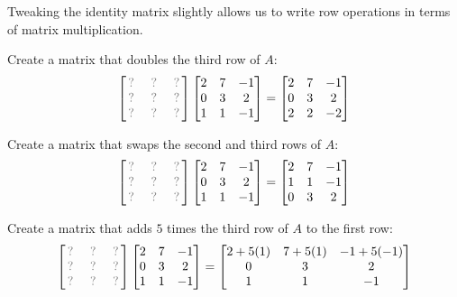 \begin{applicationActivities}
\begin{activity}{20}
Tweaking the identity matrix slightly allows us to write row operations
in terms of matrix multiplication.
\begin{subactivity}
Create a matrix that doubles the third row of \(A\):
\[
 \begin{bmatrix} \unknown & \unknown & \unknown \\ \unknown & \unknown & \unknown \\ \unknown & \unknown & \unknown \end{bmatrix}
 \begin{bmatrix} 2 & 7 & -1 \\ 0 & 3 & 2 \\ 1 & 1 & -1 \end{bmatrix}
=
 \begin{bmatrix} 2 & 7 & -1 \\ 0 & 3 & 2 \\ 2 & 2 & -2 \end{bmatrix}
\]
\end{subactivity}
\begin{subactivity}
  Create a matrix that swaps the second and third rows of \(A\):
  \[
   \begin{bmatrix} \unknown & \unknown & \unknown \\ \unknown & \unknown & \unknown \\ \unknown & \unknown & \unknown \end{bmatrix}
   \begin{bmatrix} 2 & 7 & -1 \\ 0 & 3 & 2 \\ 1 & 1 & -1 \end{bmatrix}
  =
  \begin{bmatrix} 2 & 7 & -1 \\ 1 & 1 & -1 \\ 0 & 3 & 2 \end{bmatrix}
  \]
\end{subactivity}
\begin{subactivity}
Create a matrix that adds \(5\) times the third row of \(A\) to the first row:
\[
 \begin{bmatrix} \unknown & \unknown & \unknown \\ \unknown & \unknown & \unknown \\ \unknown & \unknown & \unknown \end{bmatrix}
 \begin{bmatrix} 2 & 7 & -1 \\ 0 & 3 & 2 \\ 1 & 1 & -1 \end{bmatrix}
=
 \begin{bmatrix} 2+5(1) & 7+5(1) & -1+5(-1) \\ 0 & 3 & 2 \\ 1 & 1 & -1 \end{bmatrix}
\]
\end{subactivity}
\end{activity}


\end{applicationActivities}
